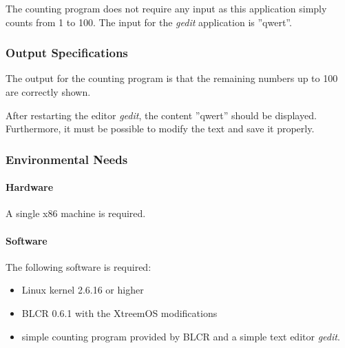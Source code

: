 The counting program does not require any input as this application simply counts from 1 to 100. The input for the \emph{gedit} application is ''qwert''.

\subsubsection{Output Specifications}
The output for the counting program is that the remaining numbers up to 100 are correctly shown.

After restarting the editor \emph{gedit}, the content ''qwert'' should be displayed. Furthermore, it must be possible to modify the text and save it properly.

\subsubsection{Environmental Needs}

\paragraph{Hardware}
A single x86 machine is required.

\paragraph{Software}
The following software is required:
\begin{itemize}
\item Linux kernel 2.6.16 or higher
\item BLCR 0.6.1 with the XtreemOS modifications
\item simple counting program provided by BLCR and a simple text editor \emph{gedit}.
\end{itemize}
